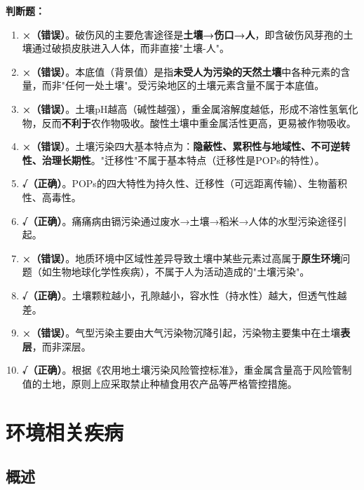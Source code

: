 \documentclass[10pt,a4paper,oneside]{ctexbook}
\begin{document}
\textbf{判断题：}
\begin{enumerate}[leftmargin=*, itemsep=5pt]
    \item \textbf{×（错误）}。破伤风的主要危害途径是\textbf{土壤→伤口→人}，即含破伤风芽孢的土壤通过破损皮肤进入人体，而非直接"土壤-人"。
    \item \textbf{×（错误）}。本底值（背景值）是指\textbf{未受人为污染的天然土壤}中各种元素的含量，而非"任何一处土壤"。受污染地区的土壤元素含量不属于本底值。
    \item \textbf{×（错误）}。土壤pH越高（碱性越强），重金属溶解度越低，形成不溶性氢氧化物，反而\textbf{不利于}农作物吸收。酸性土壤中重金属活性更高，更易被作物吸收。
    \item \textbf{×（错误）}。土壤污染四大基本特点为：\textbf{隐蔽性、累积性与地域性、不可逆转性、治理长期性}。"迁移性"不属于基本特点（迁移性是POPs的特性）。
    \item \textbf{√（正确）}。POPs的四大特性为持久性、迁移性（可远距离传输）、生物蓄积性、高毒性。
    \item \textbf{√（正确）}。痛痛病由镉污染通过废水→土壤→稻米→人体的水型污染途径引起。
    \item \textbf{×（错误）}。地质环境中区域性差异导致土壤中某些元素过高属于\textbf{原生环境}问题（如生物地球化学性疾病），不属于人为活动造成的"土壤污染"。
    \item \textbf{√（正确）}。土壤颗粒越小，孔隙越小，容水性（持水性）越大，但透气性越差。
    \item \textbf{×（错误）}。气型污染主要由大气污染物沉降引起，污染物主要集中在土壤\textbf{表层}，而非深层。
    \item \textbf{√（正确）}。根据《农用地土壤污染风险管控标准》，重金属含量高于风险管制值的土地，原则上应采取禁止种植食用农产品等严格管控措施。
\end{enumerate}

\newpage

\chapter{环境相关疾病}
\setcounter{chapter}{8}

\section{概述}
\end{document}
